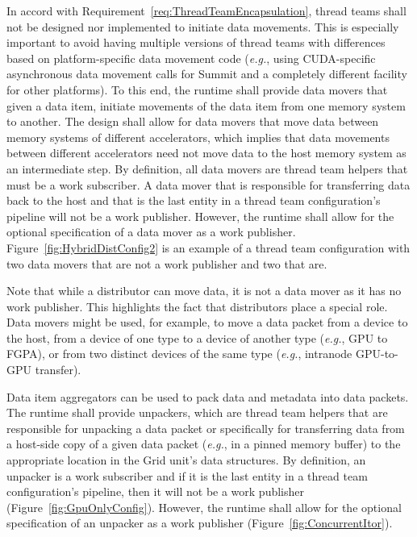 \documentclass{article}
\newcommand{\eg}{\textit{e.g.}}   %
\begin{document}
\begin{req}
In accord with Requirement~\ref{req:ThreadTeamEncapsulation}, thread teams shall
not be designed nor implemented to initiate data movements.  This is especially
important to avoid having multiple versions of thread teams with differences
based on platform-specific data movement code (\eg, using CUDA-specific
asynchronous data movement calls for Summit and a completely different facility
for other platforms).  To this end, the runtime shall provide data movers that
given a data item, initiate movements of the data item from one memory system to
another.  The design shall allow for data movers that move data between memory
systems of different accelerators, which implies that data movements between
different accelerators need not move data to the host memory system as an
intermediate step.  By definition, all data movers are thread team helpers that
must be a work subscriber.  A data mover that is responsible for transferring
data back to the host and that is the last entity in a thread team
configuration's pipeline will not be a work publisher.
However, the runtime shall allow for the optional specification of a data mover
as a work publisher.  Figure~\ref{fig:HybridDistConfig2} is an example of a
thread team configuration with two data movers that are not a work publisher and
two that are.
\end{req}

Note that while a distributor can move data, it is not a data mover as it
has no work publisher.  This highlights the fact that distributors place a
special role.  Data movers might be used, for example, to move a data packet from a device to
the host, from a device of one type to a device of another type (\eg, GPU to
FGPA), or from two distinct devices of the same type (\eg, intranode GPU-to-GPU
transfer).

\begin{req}
Data item aggregators can be used to pack data and metadata into data packets.
The runtime shall provide unpackers, which are thread team helpers that are
responsible for unpacking a data packet or specifically for transferring data
from a host-side copy of a given data packet (\eg, in a pinned memory buffer) to
the appropriate location in the Grid unit's data structures.  By definition, an
unpacker is a work subscriber and if it is the last entity in a thread team
configuration's pipeline, then it will not be a work publisher
(Figure~\ref{fig:GpuOnlyConfig}).  However, the runtime shall allow for the
optional specification of an unpacker as a work publisher
(Figure~\ref{fig:ConcurrentItor}).
\end{req}
\end{document}
